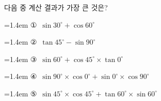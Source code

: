 다음 중 계산 결과가 가장 큰 것은?
\par\medskip\par\noindent\hangindent=1.4em {\small ①}\ $\sin 30^\circ+\cos 60^\circ$\par\noindent\hangindent=1.4em {\small ②}\ $\tan 45^\circ-\sin 90^\circ$\par\noindent\hangindent=1.4em {\small ③}\ $\sin 60^\circ+\cos 45^\circ\times\tan 0^\circ$\par\noindent\hangindent=1.4em {\small ④}\ $\sin 90^\circ\times\cos 0^\circ+\sin 0^\circ\times\cos 90^\circ$\par\noindent\hangindent=1.4em {\small ⑤}\ $\sin 45^\circ\times\cos 45^\circ+\tan 60^\circ\times\sin 60^\circ$\par\medskip
